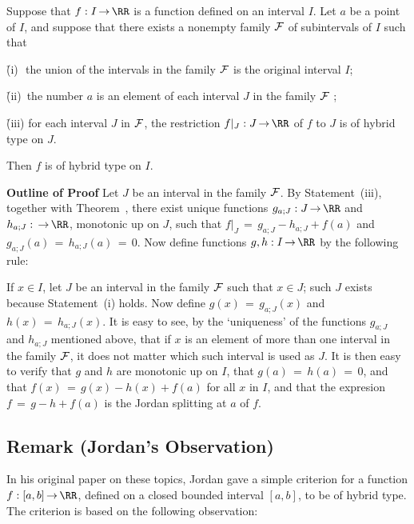 \V

        \hspace*{\parindent}Suppose that $f:I \,{\rightarrow}\, {\RR}$ is a function defined on an interval $I$.
    Let $a$ be a point of $I$, and suppose that there exists a nonempty family ${\cal F}$ of subintervals of $I$ such that

        \h (i)\,\, the union of the intervals in the family ${\cal F}$ is the original interval $I$;

        \h (ii)\, the number $a$ is an element of each interval $J$ in the family ${\cal F}$ ;

        \h (iii) for each interval $J$ in ${\cal F}$, the restriction $f|_{J}:J \,{\rightarrow}\, {\RR}$ of $f$ to $J$ is of hybrid type on $J$.

\noindent Then $f$ is of hybrid type on $I$.

\V

        {\bf Outline of Proof} Let $J$ be an interval in the family ${\cal F}$. By Statement~(iii), together with Theorem~,
    there exist unique functions $g_{a;J}:J \,{\rightarrow}\, {\RR}$ and $h_{a;J}: \,{\rightarrow}\, {\RR}$, monotonic up on $J$,
    such that $f|_{J} \,=\, g_{a;J}-h_{a;J} + f(a)$ and $g_{a;J}(a) \,=\, h_{a;J}(a) \,=\, 0$.
    Now define functions $g,h:I \,{\rightarrow}\, {\RR}$ by the following rule:

        If $x{\in}I$, let $J$ be an interval in the family ${\cal F}$ such that $x{\in}J$;
    such $J$ exists because Statement~(i) holds. Now define $g(x) \,=\, g_{a;J}(x)$ and $h(x) \,=\, h_{a;J}(x)$.
    It is easy to see, by the `uniqueness' of the functions $g_{a;J}$ and $h_{a;J}$ mentioned above,
    that if $x$ is an element of more than one interval in the family ${\cal F}$, it does not matter which such interval is used as $J$.
    It is then easy to verify that $g$ and $h$ are monotonic up on $I$, that $g(a) \,=\, h(a) \,=\, 0$, and that $f(x) \,=\, g(x)-h(x)+f(a)$ for all $x$ in $I$, and that the expresion $f \,=\, g-h+f(a)$ is the Jordan splitting at $a$ of $f$.


\V
\V

             \subsection{\small{\bf Remark} (Jordan's Observation)}
            \label{RemrkF40.185}
    
        In his original paper on these topics, Jordan gave a simple criterion for a function $f:[a,b] \,{\rightarrow}\, {\RR}$,
    defined on a closed bounded interval $[a,b]$, to be of hybrid type.
    The criterion is based on the following observation:


